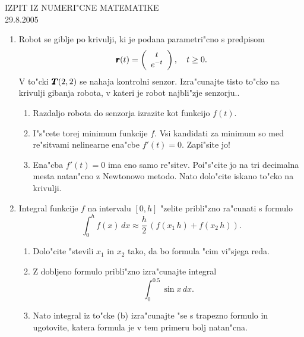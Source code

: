 \documentclass[12pt,a4paper]{article}
\def\bfm#1{{\dimen0=.01em\dimen1=.009em\makebold{$#1$}}}
\def\makebold#1{\mathord{\setbox0=\hbox{#1}%
       \copy0\kern-\wd0%
       \raise\dimen1\copy0\kern-\wd0%
       {\advance\dimen1 by \dimen1\raise\dimen1\copy0}\kern-\wd0%
       \kern\dimen0\raise\dimen1\copy0\kern-\wd0%
       {\advance\dimen1 by \dimen1\raise\dimen1\copy0}\kern-\wd0%
       \kern\dimen0\raise\dimen1\copy0\kern-\wd0%
       {\advance\dimen1 by \dimen1\raise\dimen1\copy0}\kern-\wd0%
       \kern\dimen0\raise\dimen1\copy0\kern-\wd0%
       \kern\dimen0\box0}}
\begin{document}
\begin{center}
  {\large IZPIT IZ NUMERI"CNE MATEMATIKE\\
    29.8.2005}
\end{center}
\vspace{1.5cm}
\begin{enumerate}
  \item Robot se giblje po krivulji, ki je podana parametri"cno
        s predpisom
        $$\bfm{r}(t)=
        \left(
          \begin{array}{c}
            t\\
            e^{-t}
          \end{array}
        \right),\quad t\geq 0.
        $$
        V to"cki $\bfm{T}(2,2)$ se nahaja kontrolni senzor. 
        Izra"cunajte tisto to"cko na krivulji gibanja 
        robota, v kateri je robot najbli"zje senzorju.. 
  \begin{enumerate}
    \item Razdaljo robota do senzorja izrazite kot funkcijo
      $f(t)$.
    \item I"s"cete torej minimum funkcije $f$. Vsi kandidati za 
      minimum so med re"sitvami nelinearne 
      ena"cbe $f'(t)=0$. Zapi"site jo!
    \item Ena"cba $f'(t)=0$ ima eno samo re"sitev. Poi"s"cite jo na
      tri decimalna mesta natan"cno z Newtonowo metodo. Nato
      dolo"cite iskano to"cko na krivulji.
  \end{enumerate}
  \item Integral funkcije $f$ na intervalu $[0,h]$ "zelite pribli"zno
    ra"cunati s formulo
    $$\int_0^h f(x)\,dx\approx \frac{h}{2}\,
    \left(f(x_1\,h)+f(x_2\,h)\right).$$
  \begin{enumerate}
    \item Dolo"cite "stevili $x_1$ in $x_2$ tako, da bo formula
      "cim vi"sjega reda.
    \item Z dobljeno formulo pribli"zno izra"cunajte integral
      $$\int_0^{0.5} \sin{x}\,dx.$$
    \item Nato integral iz to"cke (b) izra"cunajte "se s trapezno 
      formulo in ugotovite, katera formula je v tem primeru
      bolj natan"cna.
  \end{enumerate}
\end{enumerate}
\end{document}
